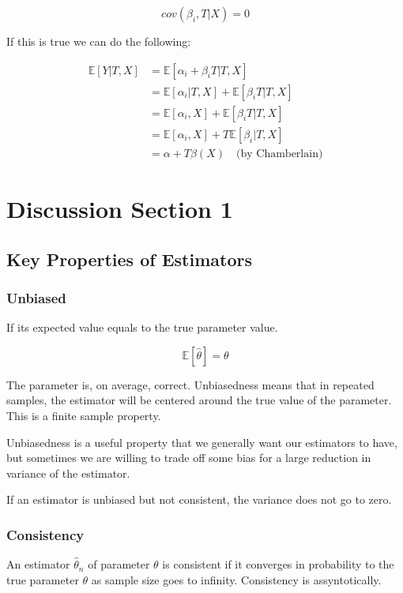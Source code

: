 \documentclass{article}
\begin{document}
$$
cov(\beta_i, T | X) = 0
$$

If this is true we can do the following:

\begin{align*}
    \mathbb{E}[Y | T, X] &= \mathbb{E}[\alpha_i + \beta_i T | T, X] \\
                         &= \mathbb{E}[\alpha_i | T, X] + \mathbb{E}[\beta_i T | T, X] \\
                         &= \mathbb{E}[\alpha_i, X] + \mathbb{E}[\beta_i T | T, X] \\
                         &= \mathbb{E}[\alpha_i, X] + T \mathbb{E}[\beta_i | T, X] \\
                         &= \alpha + T \beta(X) \quad \text{(by Chamberlain)}
\end{align*}


\section*{Discussion Section 1}

\subsection*{Key Properties of Estimators}
\subsubsection*{Unbiased}
If its expected value equals to the true parameter value.

$$
\mathbb{E}[\hat{\theta}] = \theta
$$

The parameter is, on average, correct. Unbiasedness means that in repeated samples, the estimator will be centered around the true value of the parameter. This is a finite sample property.

Unbiasedness is a useful property that we generally want our estimators to have, but sometimes we are willing to trade off some bias for a large reduction in variance of the estimator.

If an estimator is unbiased but not consistent, the variance does not go to zero.

\subsubsection*{Consistency}
An estimator $\hat{\theta}_n$ of parameter $\theta$ is consistent if it converges in probability to the true parameter $\theta$ as sample size goes to infinity. Consistency is assyntotically.
\end{document}
